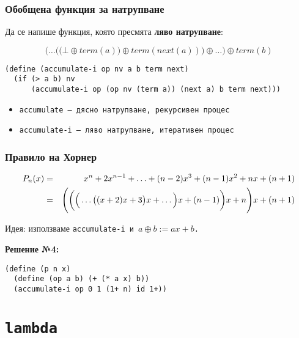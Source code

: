 \documentclass{beamer}
\begin{document}
\begin{frame}[fragile]
  \frametitle{Обобщена функция за натрупване}

  Да се напише функция, която пресмята \textbf{ляво натрупване}:

  \begin{equation*}
    \bigg(\ldots\Big(\big(\bot \oplus term(a)\big) \oplus term(next(a))\Big) \oplus \ldots\bigg) \oplus term(b)
  \end{equation*}

  \pause
  \small
\begin{verbatim}
(define (accumulate-i op nv a b term next)
  (if (> a b) nv
      (accumulate-i op (op nv (term a)) (next a) b term next)))
\end{verbatim}

  \pause
  \begin{itemize}
  \item \tt{accumulate} --- дясно натрупване, рекурсивен процес
  \item \tt{accumulate-i} --- ляво натрупване, итеративен процес
  \end{itemize}
\end{frame}

\begin{frame}[fragile]
  \frametitle{Правило на Хорнер}

  \begin{eqnarray*}
    P_n(x) &=& x^n + 2x^{n-1} + \ldots + (n-2)x^3 + (n-1)x^2 + nx + (n+1)\\
    &=& \Bigg(\bigg(\Big(\ldots\big((x + 2)x + 3\big)x + \ldots\Big)x + (n-1)\bigg)x + n\Bigg)x + (n+1)
  \end{eqnarray*}

  Идея: използваме \tt{accumulate-i} и $a \oplus b := ax + b$.
  \vspace{1em}
  \pause

  \textbf{Решение №4:}

\begin{verbatim}
(define (p n x)
  (define (op a b) (+ (* a x) b))
  (accumulate-i op 0 1 (1+ n) id 1+))
\end{verbatim}
\end{frame}

\section{\tt{lambda}}
\end{document}
